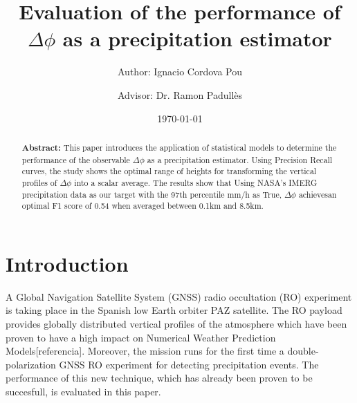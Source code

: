 \documentclass[twocolumn]{revtex4}
\begin{document}


\pagestyle{fancy}


\title{Evaluation of the performance of $\Delta \phi$ as a precipitation estimator}
\author{Author: Ignacio Cordova Pou}
\author{Advisor: Dr. Ramon Padullès}
\date{\today}

\begin{abstract}
{\bf Abstract:}
This paper introduces the application of statistical models 
to determine the performance of the observable $\Delta \phi$
as a precipitation estimator. Using Precision Recall curves, the 
study shows the optimal range of heights for transforming the vertical 
profiles of $\Delta\phi$ into a scalar average. The results show 
that Using NASA's IMERG precipitation data as our target with the 
97th percentile mm/h as True, $\Delta\phi$ achievesan optimal F1 score 
of 0.54 when averaged between 0.1km and 8.5km. 

\end{abstract}

\maketitle


\section{Introduction}

A Global Navigation Satellite System (GNSS) radio 
occultation (RO) experiment is taking place in the Spanish 
low Earth orbiter PAZ satellite. The RO payload provides
globally distributed vertical profiles of 
the atmosphere which have been proven to have a high impact on Numerical Weather
Prediction Models[referencia]. Moreover, the mission runs for the first
time a double-polarization GNSS RO experiment for detecting precipitation
events. The performance of this new technique, which has already been 
proven to be succesfull, is evaluated in this paper.
\end{document}

